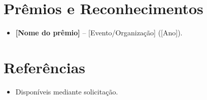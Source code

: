 \documentclass[11pt,a4paper,sans]{moderncv}
\begin{document}
\section{Prêmios e Reconhecimentos}
\vspace{1pt}
\begin{itemize}
\item{\textbf{[Nome do prêmio]} -- [Evento/Organização] ([Ano]).}
\end{itemize}


\section{Referências}
\vspace{1pt}
\begin{itemize}
\item{Disponíveis mediante solicitação.}
\end{itemize}
\end{document}
